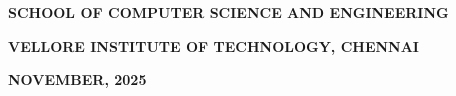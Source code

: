 \documentclass[12pt,a4paper,oneside]{report}
\begin{document}
\begin{titlepage}
\begin{center}
  \vfill
  
  {\fontsize{15}{18}\bfseries SCHOOL OF COMPUTER SCIENCE AND ENGINEERING\par}
  \vspace{0.2cm}
  {\fontsize{15}{18}\bfseries VELLORE INSTITUTE OF TECHNOLOGY, CHENNAI\par}
  \vspace{0.4cm}
  {\fontsize{12}{15}\bfseries NOVEMBER, 2025\par}

\end{center}
\end{titlepage}

\end{document}
